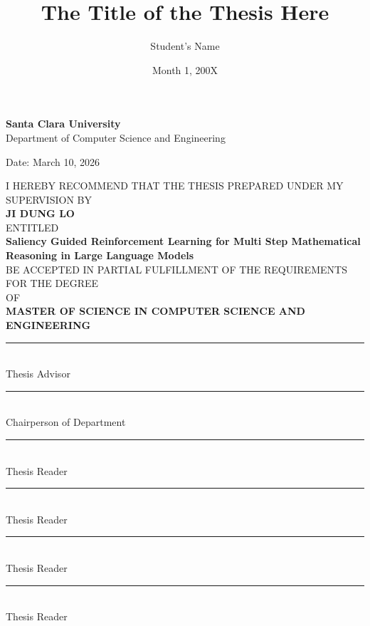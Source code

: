 \documentclass[12pt]{report}
\title{The Title of the Thesis Here}
\author{Student's Name}
\date{Month 1, 200X}
\newcommand{\sixteenpt}{\fontsize{16pt}{19.2pt}\selectfont}
\newcommand{\tenpt}{\fontsize{10pt}{12pt}\selectfont}
\newcommand{\elevenpt}{\fontsize{11pt}{13pt}\selectfont}
\begin{document}
\thispagestyle{empty}

\vspace*{0.8cm} 


{\centering
    {\sixteenpt\textbf{Santa Clara University}}\\[0.5cm]
    {\normalsize Department of Computer Science and Engineering}\\
}


\begin{flushright}
    Date: March 10, 2026
\end{flushright}

{\centering
    {\tenpt I HEREBY RECOMMEND THAT THE THESIS PREPARED UNDER MY SUPERVISION BY}\\[1cm]
    
    {\textbf{JI DUNG LO}}\\[0.25cm]
    
    {\elevenpt ENTITLED}\\[1cm]
    
    {\sixteenpt \textbf{Saliency Guided Reinforcement Learning for Multi Step Mathematical Reasoning in Large Language Models}}\\[1cm]
    
    {\tenpt BE ACCEPTED IN PARTIAL FULFILLMENT OF THE REQUIREMENTS FOR THE DEGREE}\\[0.5cm]
    
    {\tenpt OF}\\[0.5cm]
    
    {\textbf{MASTER OF SCIENCE IN COMPUTER SCIENCE AND ENGINEERING}}\\[2cm]
}

\begin{center}
    \begin{minipage}[t]{0.45\textwidth}
        \rule{2.5in}{0.4pt}\\[-0.1cm]
        Thesis Advisor\\[1cm]  
        \rule{2.5in}{0.4pt}\\[-0.1cm]
        Chairperson of Department
    \end{minipage}
    \hfill
    \begin{minipage}[t]{0.45\textwidth}
        \rule{2.5in}{0.4pt}\\[-0.1cm]
        Thesis Reader\\[1cm]
        \rule{2.5in}{0.4pt}\\[-0.1cm]
        Thesis Reader\\[1cm]
        \rule{2.5in}{0.4pt}\\[-0.1cm]
        Thesis Reader\\[1cm]
        \rule{2.5in}{0.4pt}\\[-0.1cm]
        Thesis Reader
    \end{minipage}
\end{center}
\end{document}
